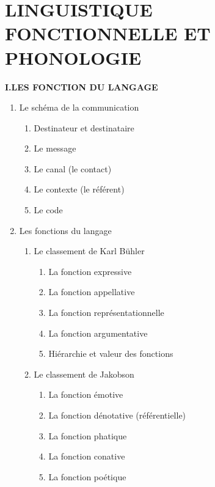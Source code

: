 \chapter{LINGUISTIQUE FONCTIONNELLE ET PHONOLOGIE}
\label{chapter-8}
\begin{keybox}
\small{}
\renewcommand{\thempfootnote}{校\arabic{editorialnote}}
\textbf{I.\quad LES FONCTION DU LANGAGE}\par
\begin{enumerate}[label=\arabic*.]
\item Le schéma de la communication
\begin{enumerate}[label=\textcircled{\scriptsize\arabic*}]
\item Destinateur et destinataire
\item Le message
\item Le canal (le contact)
\item Le contexte (le référent)
\item Le code
\end{enumerate}
\item Les fonctions du langage
\begin{enumerate}[label=\textcircled{\scriptsize\arabic*}]
\item Le classement de Karl Bühler
\begin{enumerate}[label=\arabic*.]
\item La fonction expressive
\item La fonction appellative
\item La fonction représentationnelle
\item La fonction argumentative
\item Hiérarchie et valeur des fonctions
\end{enumerate}
\item Le classement de Jakobson
\begin{enumerate}[label=\arabic*.]
\item La fonction émotive
\item La fonction dénotative (référentielle)
\item La fonction phatique
\item La fonction conative
\item La fonction poétique

\end{enumerate}
\end{enumerate}
\end{enumerate}
\end{keybox}
